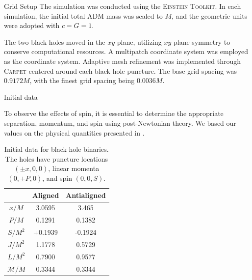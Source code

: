 \documentclass[noamssymb]{beamer}
\newlength{\colwidth}
\begin{document}
\begin{frame}[t]
\begin{columns}[t]
\begin{column}{\colwidth}
\begin{block}{Grid Setup}
  	The simulation was conducted using the \textsc{Einstein Toolkit}\cite{EinsteinToolkit:2023_05}. In each simulation, the initial total ADM mass was scaled to $M$, and the geometric units were adopted with $c=G=1$.
  	
  	The two black holes moved in the $xy$ plane, utilizing $xy$ plane symmetry to conserve computational resources. A multipatch coordinate system\cite{Pollney:2009yz} was employed as the coordinate system. Adaptive mesh refinement was implemented through \textsc{Carpet}\cite{CarpetCode:web} centered around each black hole puncture. The base grid spacing was $0.9172M$, with the finest grid spacing being $0.0036M$.
  	
  \end{block}
  
  \begin{block}{Initial data}
  	
  	To observe the effects of spin, it is essential to determine the appropriate separation, momentum, and spin using post-Newtonian theory. We based our values on the physical quantities presented in \cite{Campanelli:2006uy}. 
  	
  	\begin{table}
  		\centering
  		\begin{tabular}{c c c}
  			\toprule
  			\textbf{} & \textbf{Aligned} & \textbf{Antialigned}\\
  			\midrule
  			$x/M$ & 3.0595 & 3.465 \\
  			$P/M$ & 0.1291 & 0.1382 \\
  			$S/M^2$ & +0.1939 & -0.1924 \\
  			$J/M^2$ & 1.1778 & 0.5729 \\
  			$L/M^2$ & 0.7900 & 0.9577 \\
  			$\mathcal{M}/M$ & 0.3344 & 0.3344\\
  			\bottomrule
  		\end{tabular}
  		\caption{Initial data for black hole binaries. The holes have puncture locations $(\pm x, 0, 0)$, linear momenta $(0, \pm P, 0)$, and spin $(0, 0, S)$.}
  	\end{table}
  	

\end{block}
\end{column}
\end{columns}
\end{frame}
\end{document}
